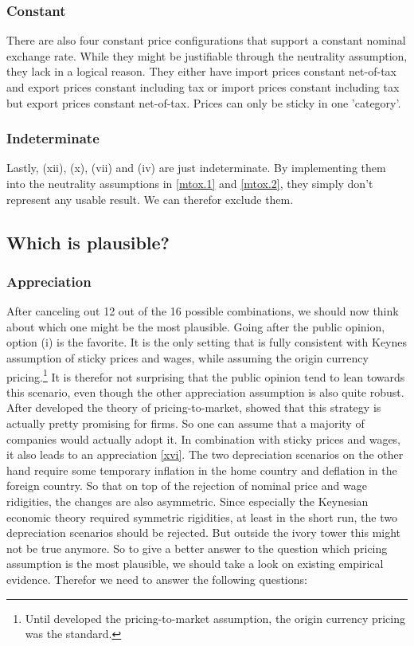 \subsubsection{Constant}
There are also four constant price configurations that support a constant nominal exchange rate. While they might be justifiable through the neutrality assumption, they lack in a logical reason. They either have import prices constant net-of-tax and export prices constant including tax or import prices constant including tax but export prices constant net-of-tax. Prices can only be sticky in one 'category'. 

\subsubsection{Indeterminate }
Lastly, (xii), (x), (vii) and (iv) are just indeterminate. By implementing them into the neutrality assumptions in \eqref{mtox.1} and  \eqref{mtox.2}, they simply don't represent any usable result. We can therefor exclude them.

\subsection{Which is plausible?}
\subsubsection*{Appreciation}
After canceling out 12 out of the 16 possible combinations, we should now think about which one might be the most plausible. Going after the public opinion, option (i) is the favorite. It is the only setting that is fully consistent with Keynes assumption of sticky prices and wages, while assuming the origin currency pricing.\footnote{Until \cite{krugman1986pricing} developed the pricing-to-market assumption, the origin currency pricing was the standard.} It is therefor not surprising that the public opinion tend to lean towards this scenario, even though the other appreciation assumption is also quite robust. After \cite{krugman1986pricing} developed the theory of pricing-to-market, \cite{fendel2008local} showed that this strategy is actually pretty promising for firms. So one can assume that a majority of companies would actually adopt it. In combination with sticky prices and wages, it also leads to an appreciation \eqref{xvi}.  
The two depreciation scenarios on the other hand require some temporary inflation in the home country and deflation in the foreign country. So that on top of the rejection of nominal price and wage ridigities, the changes are also asymmetric. Since especially the Keynesian economic theory required symmetric rigidities, at least in the short run, the two depreciation scenarios should be rejected. But outside the ivory tower this might not be true anymore. So to give a better answer to the question which pricing assumption is the most plausible, we should take a look on existing empirical evidence. Therefor we need to answer the following questions:


